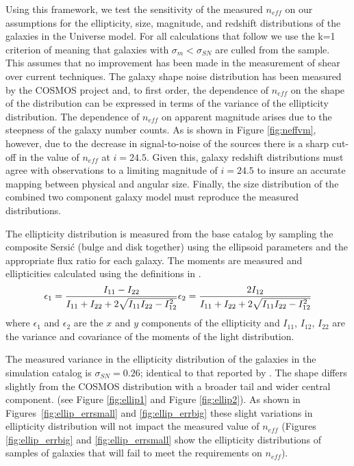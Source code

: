\documentclass[]{article}
\begin{document}
Using this framework, we test the sensitivity of the measured
$n_{eff}$ on our assumptions for the ellipticity, size, magnitude, and
redshift distributions of the galaxies in the Universe model.  For all
calculations that follow we use the k=1 criterion of \citet{chang}
meaning that galaxies with $\sigma_m < \sigma_{SN}$ are culled from
the sample. This assumes that no improvement has been made in the
measurement of shear over current techniques.  The galaxy shape noise
distribution has been measured by the COSMOS project \citep{cosmos}
and, to first order, the dependence of $n_{eff}$ on the shape of the
distribution can be expressed in terms of the variance of the
ellipticity distribution. The dependence of $n_{eff}$ on apparent
magnitude arises due to the steepness of the galaxy number counts. As
is shown in Figure \ref{fig:neffvm}, however, due to the decrease in
signal-to-noise of the sources there is a sharp cut-off in the value
of $n_{eff}$ at $i=24.5$.  Given this, galaxy redshift distributions
must agree with observations to a limiting magnitude of $i=24.5$ to
insure an accurate mapping between physical and angular size.
Finally, the size distribution of the combined two component galaxy
model must reproduce the measured distributions.

The ellipticity distribution is measured from the base catalog by
sampling the composite Sersi{\'c} (bulge and disk together) using the
ellipsoid parameters and the appropriate flux ratio for each galaxy.
The moments are measured and ellipticities calculated using the
definitions in \citet{chang}.
\begin{equation}
\epsilon_1 = \frac{I_{11}-I_{22}}{I_{11}+I_{22}+2\sqrt{I_{11}I_{22} - I^{2}_{12}}}\\
\epsilon_2 = \frac{2I_{12}}{I_{11}+I_{22}+2\sqrt{I_{11}I_{22} - I^{2}_{12}}}
\end{equation}
where $\epsilon_1$ and $\epsilon_2$ are the $x$ and $y$ components of
the ellipticity and $I_{11}$, $I_{12}$, $I_{22}$ are the variance and
covariance of the moments of the light distribution.

The measured variance in the ellipticity distribution of the galaxies
in the simulation catalog is $\sigma_{SN} = 0.26$; identical to that
reported by \citet{chang}. The shape differs slightly from the COSMOS
distribution with a broader tail and wider central component. (see
Figure \ref{fig:ellip1} and Figure \ref{fig:ellip2}).  As shown in
Figures~\ref{fig:ellip_errsmall} and \ref{fig:ellip_errbig} these
slight variations in ellipticity distribution will not impact the
measured value of $n_{eff}$ (Figures \ref{fig:ellip_errbig} and
\ref{fig:ellip_errsmall} show the ellipticity distributions of samples
of galaxies that will fail to meet the requirements on $n_{eff}$).
\end{document}
